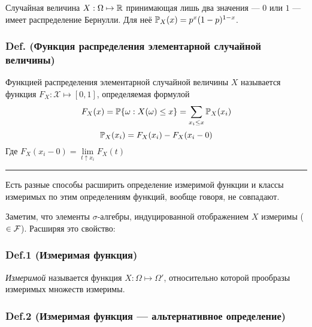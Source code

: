 Случайная величина \(X : \Omega\mapsto\mathbb R\) принимающая лишь два
значения --- \(0\) или \(1\) --- имеет распределение Бернулли. Для неё
\(\mathbb P_X (x) = p^x (1-p)^{1-x}\).

\subsubsection{Def. (Функция распределения элементарной случайной
величины)}\label{def.-ux444ux443ux43dux43aux446ux438ux44f-ux440ux430ux441ux43fux440ux435ux434ux435ux43bux435ux43dux438ux44f-ux44dux43bux435ux43cux435ux43dux442ux430ux440ux43dux43eux439-ux441ux43bux443ux447ux430ux439ux43dux43eux439-ux432ux435ux43bux438ux447ux438ux43dux44b}

Функцией распределения элементарной случайной величины \(X\) называется
функция \(F_X : \mathcal X\mapsto [0,1]\), определяемая формулой
\[ F_X (x) = \mathbb P \{\omega: X(\omega) \leq x \} = \sum\limits_{x_i \leq x} \mathbb P_X (x_i)\]
\[ \mathbb P_X (x_i) = F_X (x_i) - F_X(x_i - 0)\] Где
\(F_X (x_i - 0) = \lim\limits_{t\uparrow x_i} F_X (t)\)

\begin{center}\rule{0.5\linewidth}{\linethickness}\end{center}

Есть разные способы расширить определение измеримой функции и классы
измеримых по этим определениям функций, вообще говоря, не совпадают.

Заметим, что элементы \(\sigma\)-алгебры, индуцированной отображением
\(X\) измеримы (\(\in\mathcal F\)). Расширяя это свойство:

\subsubsection{Def.1 (Измеримая
функция)}\label{def.1-ux438ux437ux43cux435ux440ux438ux43cux430ux44f-ux444ux443ux43dux43aux446ux438ux44f}

\emph{Измеримой} называется функция \(X : \Omega\mapsto\Omega\prime\),
относительно которой прообразы измеримых множеств измеримы.

\subsubsection{Def.2 (Измеримая функция --- альтернативное
определение)}\label{def.2-ux438ux437ux43cux435ux440ux438ux43cux430ux44f-ux444ux443ux43dux43aux446ux438ux44f-ux430ux43bux44cux442ux435ux440ux43dux430ux442ux438ux432ux43dux43eux435-ux43eux43fux440ux435ux434ux435ux43bux435ux43dux438ux435}

